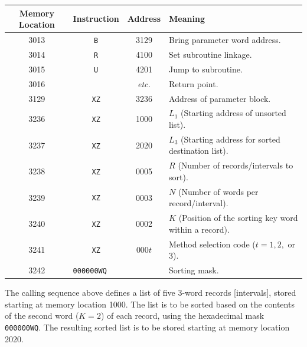 \begin{table}[h!]
\centering
\begin{tabularx}{\textwidth}{cccX}
\toprule
\textbf{Memory Location} & \textbf{Instruction} & \textbf{Address} & \textbf{Meaning} \\
\midrule
3013 & \texttt{B} & 3129 & Bring parameter word address. \\
3014 & \texttt{R} & 4100 & Set subroutine linkage. \\
3015 & \texttt{U} & 4201 & Jump to subroutine. \\
3016 &            & \textit{etc.} & Return point. \\
\midrule
3129 & \texttt{XZ} & 3236 & Address of parameter block. \\
\midrule
3236 & \texttt{XZ} & 1000 & $L_1$ (Starting address of unsorted list). \\
3237 & \texttt{XZ} & 2020 & $L_3$ (Starting address for sorted destination list). \\
3238 & \texttt{XZ} & 0005 & $R$ (Number of records/intervals to sort). \\
3239 & \texttt{XZ} & 0003 & $N$ (Number of words per record/interval). \\
3240 & \texttt{XZ} & 0002 & $K$ (Position of the sorting key word within a record). \\
3241 & \texttt{XZ} & $000t$ & Method selection code ($t = 1, 2,$ or $3$). \\
3242 & \multicolumn{2}{l}{\texttt{000000WQ}} & Sorting mask. \\
\bottomrule
\end{tabularx}
\end{table}
\pagebreak
The calling sequence above defines a list of five 3-word records [intervals], stored starting at memory location 1000. The list is to be sorted based on the contents of the second word ($K=2$) of each record, using the hexadecimal mask \texttt{000000WQ}. The resulting sorted list is to be stored starting at memory location 2020.

